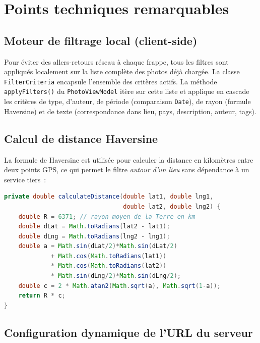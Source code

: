 \documentclass[12pt, a4paper]{report}
\begin{document}
\chapter{Points techniques remarquables}

\section{Moteur de filtrage local (client-side)}

Pour éviter des allers-retours réseau à chaque frappe, tous les filtres sont appliqués
localement sur la liste complète des photos déjà chargée. La classe \texttt{FilterCriteria}
encapsule l'ensemble des critères actifs. La méthode \texttt{applyFilters()} du
\texttt{PhotoViewModel} itère sur cette liste et applique en cascade les critères de type,
d'auteur, de période (comparaison \texttt{Date}), de rayon (formule Haversine) et de texte
(correspondance dans lieu, pays, description, auteur, tags).

\section{Calcul de distance Haversine}

La formule de Haversine est utilisée pour calculer la distance en kilomètres entre deux
points GPS, ce qui permet le filtre \emph{autour d'un lieu} sans dépendance à un service
tiers~:

\begin{lstlisting}[language=Java, caption=Calcul de distance Haversine (PhotoViewModel)]
private double calculateDistance(double lat1, double lng1,
                                 double lat2, double lng2) {
    double R = 6371; // rayon moyen de la Terre en km
    double dLat = Math.toRadians(lat2 - lat1);
    double dLng = Math.toRadians(lng2 - lng1);
    double a = Math.sin(dLat/2)*Math.sin(dLat/2)
             + Math.cos(Math.toRadians(lat1))
             * Math.cos(Math.toRadians(lat2))
             * Math.sin(dLng/2)*Math.sin(dLng/2);
    double c = 2 * Math.atan2(Math.sqrt(a), Math.sqrt(1-a));
    return R * c;
}
\end{lstlisting}

\section{Configuration dynamique de l'URL du serveur}
\end{document}
